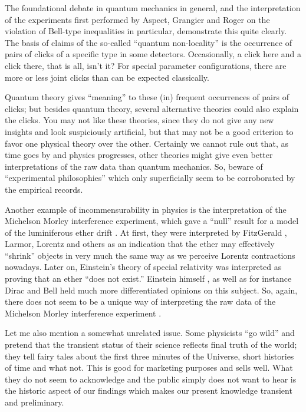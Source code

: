 \documentclass{article}
\begin{document}
The foundational debate in quantum mechanics in general,
and the interpretation of the experiments first performed by Aspect, Grangier and Roger
\cite{aspect-81,aspect-82a,aspect-82b} on the violation of Bell-type inequalities in particular,
demonstrate this quite clearly.
The basis of claims of the so-called ``quantum non-locality''
is the occurrence of pairs of clicks of a specific type in some detectors.
Occasionally, a click here and a click there, that is all, isn't it?
For special parameter configurations, there are more or less joint clicks
than can be expected classically.

Quantum theory gives ``meaning'' to these (in) frequent occurrences of pairs of clicks;
but besides quantum theory, several alternative theories could also explain the clicks.
You may not like these theories, since they do not give any new insights
and look suspiciously artificial, but that may not be a good criterion to favor one physical theory
over the other.
Certainly we cannot rule out that,
as time goes by and physics progresses, other theories might give
even better interpretations of the raw data than quantum mechanics.
So, beware of ``experimental philosophies'' which only superficially seem to be corroborated
by the empirical records.

Another example of  incommensurability in physics is the interpretation of
the Michelson Morley interference experiment,
which gave a ``null'' result
for a model of the luminiferous ether drift \cite{mi-mo-1887,Shankland}.
At first, they were interpreted by  FitzGerald \cite{FitzGerald2,bell-92}, Larmor, Lorentz and others
as an indication that the ether may effectively ``shrink'' objects in very much the same way
as we perceive Lorentz contractions nowadays.
Later on, Einstein's theory of special relativity \cite{ein-05} was interpreted as proving that
an ether ``does not exist.''
Einstein himself \cite{einstein-aether}, as well as for instance Dirac \cite{dirac-aether}
and Bell \cite{bell-sr1,bell-92} held much more differentiated opinions on this subject.
So, again, there does not seem to be a unique way of interpreting the raw data of
the Michelson Morley interference experiment \cite{sterret98}.


Let me also mention a somewhat unrelated issue.
Some physicists ``go wild'' and pretend that the transient status of their science reflects
final truth of the world; they
tell fairy tales about the first three minutes of the Universe, short histories of time and what not.
This is good for marketing purposes and sells well.
What they do not seem to acknowledge and the public simply does not want to hear
is the historic aspect of our findings which makes our present knowledge transient
and preliminary.
\end{document}
